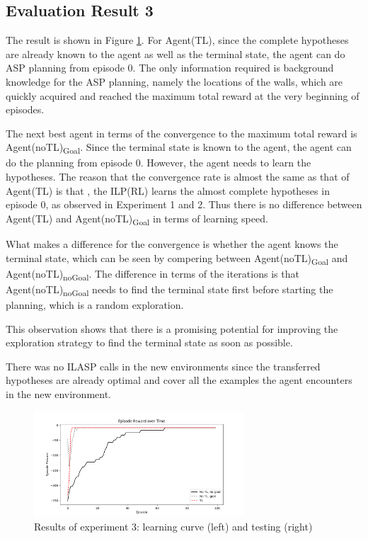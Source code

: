 

\subsection{Evaluation Result 3}
The result is shown in Figure \ref{experiment3_training}.
For Agent(TL), since the complete hypotheses are already known to the agent as well as the terminal state, the agent can do ASP planning from episode 0.
The only information required is background knowledge for the ASP planning, namely the locations of the walls, which are quickly acquired and reached the maximum total reward at the very beginning of episodes.

The next best agent in terms of the convergence to the maximum total reward is Agent(noTL)\textsubscript{Goal}. Since the terminal state is known to the agent, 
the agent can do the planning from episode 0. However, the agent needs to learn the hypotheses. The reason that the convergence rate is almost the same as that of Agent(TL) is that
, the ILP(RL) learns the almost complete hypotheses in episode 0, as observed in Experiment 1 and 2. 
Thus there is no difference between Agent(TL) and Agent(noTL)\textsubscript{Goal} in terms of learning speed. 

What makes a difference for the convergence is whether the agent knows the terminal state, which can be seen by compering between Agent(noTL)\textsubscript{Goal} and Agent(noTL)\textsubscript{noGoal}.
The difference in terms of the iterations is that Agent(noTL)\textsubscript{noGoal} needs to find the terminal state first before starting the planning, which is a random exploration.

This observation shows that there is a promising potential for improving the exploration strategy to find the terminal state as soon as possible.

There was no ILASP calls in the new environments since the transferred hypotheses are already optimal and cover all the examples the agent encounters in the new environment.

\begin{figure}[!htb]
\centering
\includegraphics[width=0.7\textwidth]{./figures/experiment3_after_test}
\caption{Results of experiment 3: learning curve (left) and testing (right)}
\label{experiment3_training}
\end{figure}

